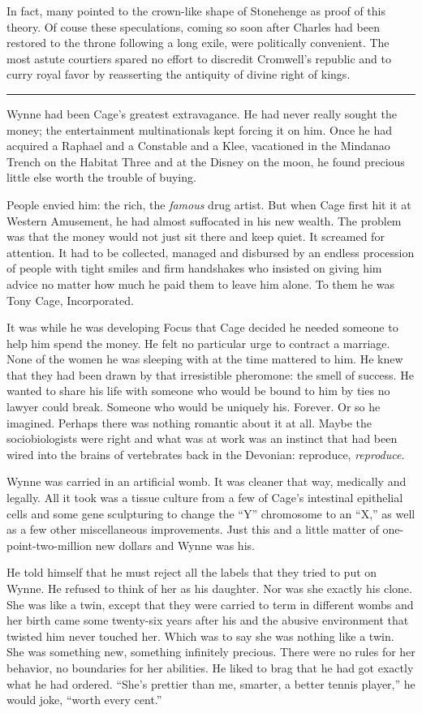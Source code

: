 In fact, many pointed to the crown-like shape of Stonehenge as proof of this theory. Of couse these speculations, coming so soon after Charles had been restored to the throne following a long exile, were politically convenient. The most astute courtiers spared no effort to discredit Cromwell's republic and to curry royal favor by reasserting the antiquity of divine right of kings.

\fancybreak{* * *}

Wynne had been Cage's greatest extravagance. He had never really sought the money; the entertainment multinationals kept forcing it on him. Once he had acquired a Raphael and a Constable and a Klee, vacationed in the Mindanao Trench on the Habitat Three and at the Disney on the moon, he found precious little else worth the trouble of buying.

People envied him: the rich, the \textit{famous} drug artist. But when Cage first hit it at Western Amusement, he had almost suffocated in his new wealth. The problem was that the money would not just sit there and keep quiet. It screamed for attention. It had to be collected, managed and disbursed by an endless procession of people with tight smiles and firm handshakes who insisted on giving him advice no matter how much he paid them to leave him alone. To them he was Tony Cage, Incorporated.

It was while he was developing Focus that Cage decided he needed someone to help him spend the money. He felt no particular urge to contract a marriage. None of the women he was sleeping with at the time mattered to him. He knew that they had been drawn by that irresistible pheromone: the smell of success. He wanted to share his life with someone who would be bound to him by ties no lawyer could break. Someone who would be uniquely his. Forever. Or so he imagined. Perhaps there was nothing romantic about it at all. Maybe the sociobiologists were right and what was at work was an instinct that had been wired into the brains of vertebrates back in the Devonian: reproduce, \textit{reproduce}.

Wynne was carried in an artificial womb. It was cleaner that way, medically and legally. All it took was a tissue culture from a few of Cage's intestinal epithelial cells and some gene sculpturing to change the ``Y'' chromosome to an ``X,'' as well as a few other miscellaneous improvements. Just this and a little matter of one-point-two-million new dollars and Wynne was his.

He told himself that he must reject all the labels that they tried to put on Wynne. He refused to think of her as his daughter. Nor was she exactly his clone. She was like a twin, except that they were carried to term in different wombs and her birth came some twenty-six years after his and the abusive environment that twisted him never touched her. Which was to say she was nothing like a twin. She was something new, something infinitely precious. There were no rules for her behavior, no boundaries for her abilities. He liked to brag that he had got exactly what he had ordered. ``She's prettier than me, smarter, a better tennis player,'' he would joke, ``worth every cent.''

